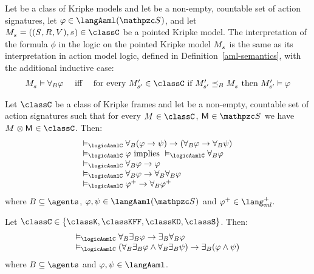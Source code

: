 \begin{definition}\label{aaml-semantics-alt}
Let \classC{} be a class of Kripke models and let \aSignatureFamily{} be a non-empty, countable set of action signatures, let $\phi \in \langAaml(\aSignatureFamily)$, and let $\kPModelAndTuple{\kStateS} \in \classC$ be a pointed Kripke model.
The interpretation of the formula $\phi$ in the logic \logicAamlC{} on the pointed Kripke model $\kPModel{\kStateS}$ is the same as its interpretation in action model logic, defined in Definition~\ref{aml-semantics}, with the additional inductive case:
$$
\begin{array}{lcl}
    \kPModel{\kStateS} \entails \allactsBs \phi & \text{ iff } & \text{for every } \kPModelP{\kStateSP} \in \classC \text{ if } \kPModelP{\kStateSP} \refinesBs \kPModel{\kStateS} \text{ then } \kPModelP{\kStateSP} \entails \phi
\end{array}
$$
\end{definition}

\begin{proposition}\label{aaml-validities}
Let $\classC$ be a class of Kripke frames and let \aSignatureFamily{} be a non-empty, countable set of action signatures such that for every $\kModel \in \classC$, $\aModel \in \aSignatureFamily$ we have $\kModel \exec \aModel \in \classC$. Then:
$$
\begin{array}{l}
    \entails_\logicAamlC \allrefsBs (\phi \implies \psi) \implies (\allrefsBs \phi \implies \allrefsBs \psi)\\
    \entails_\logicAamlC \phi \text{ implies } \entails_\logicAamlC \allrefsBs \phi\\
    \entails_\logicAamlC \allrefsBs \phi \implies \phi\\
    \entails_\logicAamlC \allrefsBs \phi \implies \allrefsBs \allrefsBs \phi\\
    \entails_\logicAamlC \phi^+ \implies \allrefsBs \phi^+
\end{array}
$$
where $\agentsB \subseteq \agents$, $\phi, \psi \in \langAaml(\aSignatureFamily)$ and $\phi^+ \in \langMlPlus$.
\end{proposition}

\begin{proposition}\label{aaml-mckinsey}
Let $\classC \in \{\classK, \classKFF, \classKD, \classS\}$. Then:
$$
\begin{array}{l}
    \entails_\logicAamlC \allrefsBs \somerefsBs \phi \implies \somerefsBs \allrefsBs \phi\\
    \entails_\logicAamlC (\allrefsBs \somerefsBs \phi \land \allrefsBs \somerefsBs \psi) \implies \somerefsBs (\phi \land \psi)
\end{array}
$$
where $\agentsB \subseteq \agents$ and $\phi, \psi \in \langAaml$.
\end{proposition}

